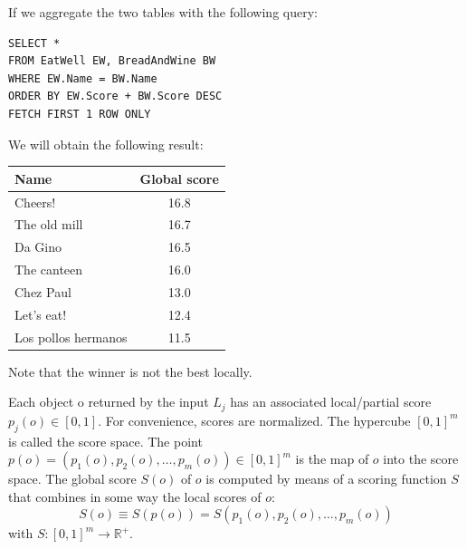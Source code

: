 \begin{example}
\begin{table}[H]
    \end{table}
    If we aggregate the two tables with the following query: 
    \begin{lstlisting}[style=SQL]
SELECT *
FROM EatWell EW, BreadAndWine BW
WHERE EW.Name = BW.Name
ORDER BY EW.Score + BW.Score DESC
FETCH FIRST 1 ROW ONLY 
    \end{lstlisting}
    We will obtain the following result: 
    \begin{table}[H]
        \centering
        \begin{tabular}{|lc|}
        \hline
        \textbf{Name}       & \textbf{Global score} \\ \hline
        Cheers!             & 16.8                  \\ \hline
        The old mill        & 16.7                  \\ \hline
        Da Gino             & 16.5                  \\ \hline
        The canteen         & 16.0                  \\ \hline
        Chez Paul           & 13.0                  \\ \hline
        Let's eat!          & 12.4                  \\ \hline
        Los pollos hermanos & 11.5                  \\ \hline
        \end{tabular}
    \end{table}
    Note that the winner is not the best locally. 
\end{example}
Each object o returned by the input $L_j$ has an associated local/partial score $p_j(o) \in [0,1]$. For convenience, scores are normalized. The hypercube $[0,1]^m$ 
is called the score space. The point $p(o) = (p_1(o),p_2(o),\dots,p_m(o)) \in [0,1]^m$ is the map of $o$ into the score space. The global score $S(o)$ of $o$ is 
computed by means of a scoring function $S$ that combines in some way the local scores of $o$:
\[S(o) \equiv  S(p(o)) = S(p_1(o),p_2(o),\dots,p_m(o))\]
with $S:[0,1]^m \rightarrow \mathbb{R}^{+}$. 
